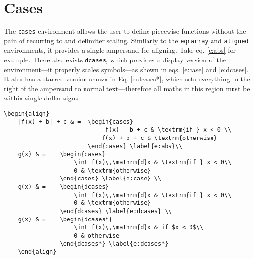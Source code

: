 \section{Cases}
%
The \verb|cases| environment allows the user to define piecewise
functions without the pain of recurring to  and
delimiter scaling.  Similarly to the \verb|eqnarray| and
\verb|aligned| environments, it provides a single ampersand for
aligning.  Take eq. \eqref{e:abs} for example.  There also exists
\verb|dcases|, which provides a display version of the
environment---it properly scales symbols---as shown in eqs.
\eqref{e:case} and \eqref{e:dcases}.  It also has a starred version
shown in Eq. \eqref{e:dcases*}, which sets everything to the right of
the ampersand to normal text---therefore all maths in this region must
be within single dollar signs.
\begin{verbatim}
\begin{align}
    |f(x) + b| + c & =  \begin{cases}
                            -f(x) - b + c & \textrm{if } x < 0 \\
                            f(x) + b + c & \textrm{otherwise}
                        \end{cases} \label{e:abs}\\
    g(x) & =    \begin{cases}
                    \int f(x)\,\mathrm{d}x & \textrm{if } x < 0\\
                    0 & \textrm{otherwise}
                \end{cases} \label{e:case} \\
    g(x) & =    \begin{dcases}
                    \int f(x)\,\mathrm{d}x & \textrm{if } x < 0\\
	                0 & \textrm{otherwise}
                \end{dcases} \label{e:dcases} \\
    g(x) & =    \begin{dcases*}
                    \int f(x)\,\mathrm{d}x & if $x < 0$\\
                    0 & otherwise
                \end{dcases*} \label{e:dcases*}
	\end{align}
\end{verbatim}
